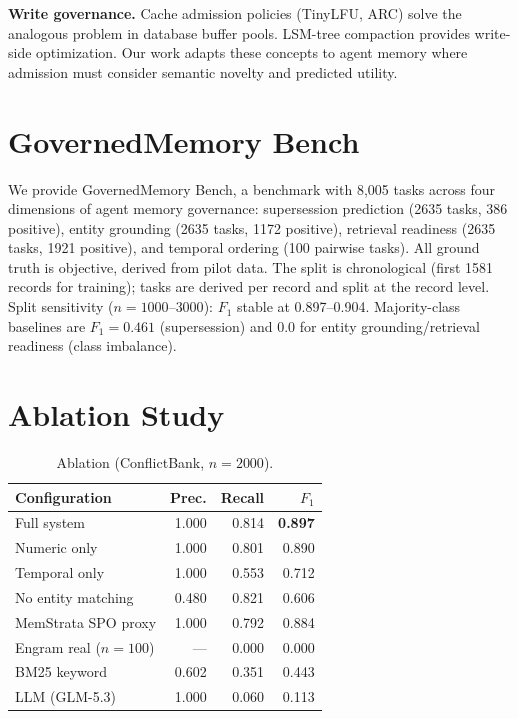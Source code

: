 \documentclass{llncs}
\begin{document}
\textbf{Write governance.} Cache admission policies (TinyLFU, ARC) solve the analogous problem in database buffer pools. LSM-tree compaction provides write-side optimization. Our work adapts these concepts to agent memory where admission must consider semantic novelty and predicted utility.

\section{GovernedMemory Bench}


We provide GovernedMemory Bench, a benchmark with 8{,}005 tasks across four dimensions of agent memory governance: supersession prediction (2{}635 tasks, 386 positive), entity grounding (2{}635 tasks, 1{}172 positive), retrieval readiness (2{}635 tasks, 1{}921 positive), and temporal ordering (100 pairwise tasks). All ground truth is objective, derived from pilot data. The split is chronological (first 1{}581 records for training); tasks are derived per record and split at the record level. Split sensitivity ($n{=}1000$--$3000$): $F_1$ stable at 0.897--0.904. Majority-class baselines are $F_1{=}0.461$ (supersession) and 0.0 for entity grounding/retrieval readiness (class imbalance).

\section{Ablation Study}

\begin{table}[h]
\centering
\caption{Ablation (ConflictBank, $n{=}2{}000$).}
\begin{tabular}{lrrr}
\toprule
Configuration & Prec. & Recall & $F_1$ \\
\midrule
Full system & 1.000 & 0.814 & \textbf{0.897} \\
Numeric only & 1.000 & 0.801 & 0.890 \\
Temporal only & 1.000 & 0.553 & 0.712 \\
No entity matching & 0.480 & 0.821 & 0.606 \\
MemStrata SPO proxy & 1.000 & 0.792 & 0.884 \\
Engram real ($n{=}100$) & --- & 0.000 & 0.000 \\
BM25 keyword & 0.602 & 0.351 & 0.443 \\
LLM (GLM-5.3) & 1.000 & 0.060 & 0.113 \\
\bottomrule
\end{tabular}
\end{table}
\end{document}
